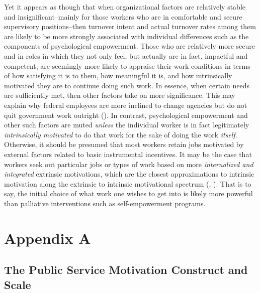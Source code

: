 \documentclass[
  11pt,
  a4paper,
]{article}
\begin{document}
Yet it appears as though that when organizational factors are relatively
stable and insignificant--mainly for those workers who are in
comfortable and secure supervisory positions--then turnover intent and
actual turnover rates among them are likely to be more strongly
associated with individual differences such as the components of
psychological empowerment. Those who are relatively more secure and in
roles in which they not only feel, but actually are in fact, impactful
and competent, are seemingly more likely to appraise their work
conditions in terms of how satisfying it is to them, how meaningful it
is, and how intrinsically motivated they are to continue doing such
work. In essence, when certain needs are sufficiently met, then other
factors take on more significance. This may explain why federal
employees are more inclined to change agencies but do not quit
government work outright ().
In contrast, psychological empowerment and other such factors are muted
\emph{unless} the individual worker is in fact legitimately
\emph{intrinsically motivated} to do that work for the sake of doing the
work \emph{itself}. Otherwise, it should be presumed that most workers
retain jobs motivated by external factors related to basic instrumental
incentives. It may be the case that workers seek out particular jobs or
types of work based on more \emph{internalized and integrated} extrinsic
motivations, which are the closest approximations to intrinsic
motivation along the extrinsic to intrinsic motivational spectrum
(,
). That is to say, the initial choice of
what work one wishes to get into is likely more powerful than palliative
interventions such as self-empowerment programs.

\newpage

\section{Appendix A}\label{appendix-a}

\subsection{The Public Service Motivation Construct and
Scale}\label{the-public-service-motivation-construct-and-scale}
\end{document}

